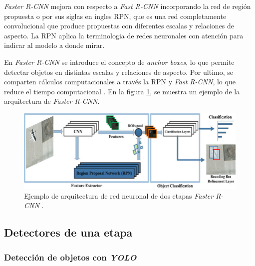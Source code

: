 \textit{Faster R-CNN} mejora con respecto a \textit{Fast R-CNN} incorporando la red de región propuesta o por sus siglas en ingles RPN, que es una red completamente convolucional que produce propuestas con diferentes escalas y relaciones de aspecto. La RPN aplica la terminologia de redes neuronales con atención para indicar al modelo a donde mirar.

En \textit{Faster R-CNN} se introduce el concepto de \textit{anchor boxes}, lo que permite detectar objetos en distintas escalas y relaciones de aspecto. Por ultimo, se comparten cálculos computacionales a través la RPN y \textit{Fast R-CNN}, lo que reduce el tiempo computacional \cite{ARTICLE:9}. En la figura \ref{fig:Faster-rcnn}, se muestra un ejemplo de la arquitectura de \textit{Faster R-CNN}.

\begin{figure}[ht]
	\centering
	\includegraphics[scale=1.3]{./Figures/Faster-rcnn.png}
	\caption{Ejemplo de arquitectura de red neuronal de dos etapas \textit{Faster R-CNN} \cite{ARTICLE:11}.}
	\label{fig:Faster-rcnn}
\end{figure}

 

\subsection{Detectores de una etapa}

\subsubsection{Detección de objetos con \textit{YOLO}}

